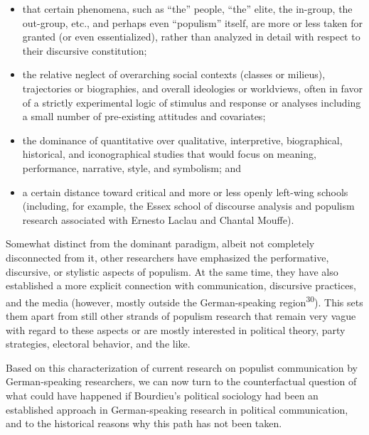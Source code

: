 \documentclass{tufte-handout}
\begin{document}
\begin{itemize}
\item
  that certain phenomena, such as ``the'' people, ``the'' elite, the
  in-group, the out-group, etc., and perhaps even ``populism'' itself,
  are more or less taken for granted (or even essentialized), rather
  than analyzed in detail with respect to their discursive constitution;
\item
  the relative neglect of overarching social contexts (classes or
  milieus), trajectories or biographies, and overall ideologies or
  worldviews, often in favor of a strictly experimental logic of
  stimulus and response or analyses including a small number of
  pre-existing attitudes and covariates;
\item
  the dominance of quantitative over qualitative, interpretive,
  biographical, historical, and iconographical studies that would focus
  on meaning, performance, narrative, style, and symbolism; and
\item
  a certain distance toward critical and more or less openly left-wing
  schools (including, for example, the Essex school of discourse
  analysis and populism research associated with Ernesto Laclau and
  Chantal Mouffe).
\end{itemize}

Somewhat distinct from the dominant paradigm, albeit not completely
disconnected from it, other researchers have emphasized the
performative, discursive, or stylistic aspects of populism. At the same
time, they have also established a more explicit connection with
communication, discursive practices, and the media (however, mostly
outside the German-speaking region\textsuperscript{30}). This sets
them apart from still other strands of populism research that remain
very vague with regard to these aspects or are mostly interested in
political theory, party strategies, electoral behavior, and the like.

Based on this characterization of current research on populist
communication by German-speaking researchers, we can now turn to the
counterfactual question of what could have happened if Bourdieu's
political sociology had been an established approach in German-speaking
research in political communication, and to the historical reasons why
this path has not been taken.
\end{document}
